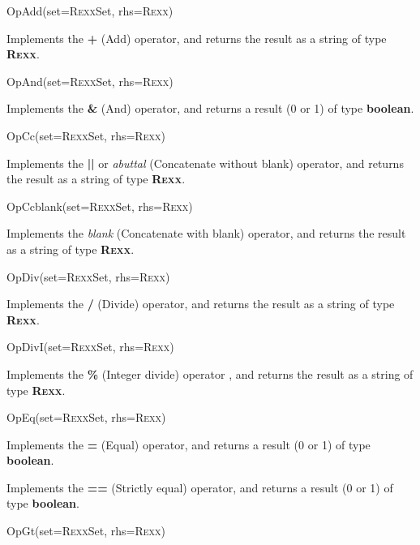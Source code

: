 \begin{description}
\item{OpAdd(set=R\textsc{exx}Set, rhs=R\textsc{exx})}

Implements the \nr{} \textbf{\textbf{+}} (Add) operator,
and returns the result as a string of type \textbf{R\textsc{exx}}.
\item{OpAnd(set=R\textsc{exx}Set, rhs=R\textsc{exx})}

Implements the \nr{} \textbf{\textbf{\&}} (And)
operator,
and returns a result (0 or 1) of type \textbf{boolean}.
\item{OpCc(set=R\textsc{exx}Set, rhs=R\textsc{exx})}

Implements the \nr{} \textbf{\textbf{||}} or
\emph{abuttal} (Concatenate without blank) operator, and
returns the result as a string of type \textbf{R\textsc{exx}}.
\item{OpCcblank(set=R\textsc{exx}Set, rhs=R\textsc{exx})}

Implements the \nr{} \emph{blank} (Concatenate with blank)
operator, and returns the result as a string of type \textbf{R\textsc{exx}}.
\item{OpDiv(set=R\textsc{exx}Set, rhs=R\textsc{exx})}

Implements the \nr{} \textbf{\textbf{/}} (Divide) operator,
and returns the result as a string of type \textbf{R\textsc{exx}}.
\item{OpDivI(set=R\textsc{exx}Set, rhs=R\textsc{exx})}

Implements the \nr{} \textbf{\textbf{\%}} (Integer divide) operator
, and returns the result as a string of type \textbf{R\textsc{exx}}.
\item{OpEq(set=R\textsc{exx}Set, rhs=R\textsc{exx})}

Implements the \nr{} \textbf{\textbf{=}} (Equal) operator,
and returns a result (0 or 1) of type \textbf{boolean}.
\item[OpEqS(set=R\textsc{exx}Set, rhs=R\textsc{exx})]\label{refopeqs}

Implements the \nr{} \textbf{\textbf{==}} (Strictly equal)
operator, and returns a result (0 or 1) of type \textbf{boolean}.
\item{OpGt(set=R\textsc{exx}Set, rhs=R\textsc{exx})}


\end{description}
